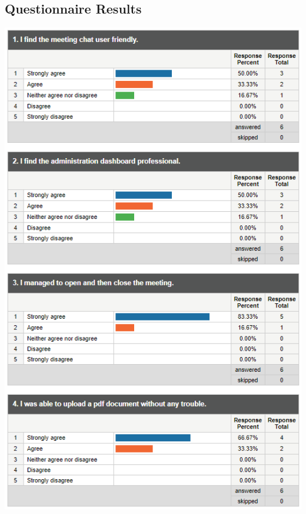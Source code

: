 \documentclass{article}
\begin{document}
\subsection{Questionnaire Results}
  \begin{center}
  \includegraphics[scale=0.83]{implementation/questionnaire1.png}
  \label{fig:questionnaire1}


\end{center}
\end{document}
